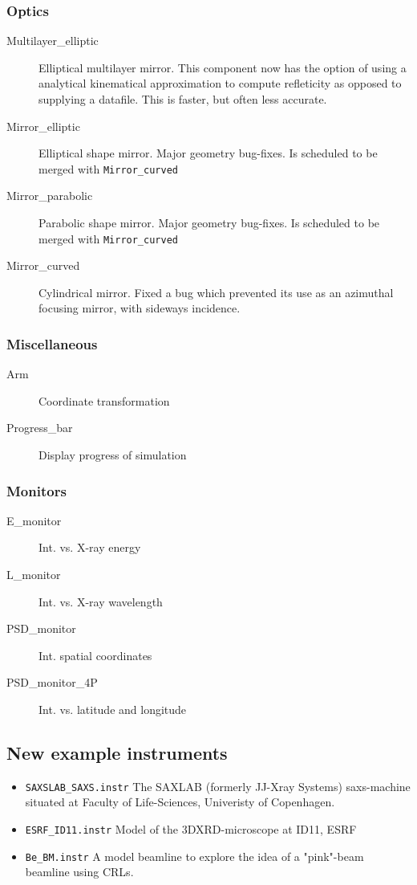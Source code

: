 \subsubsection*{Optics}
\begin{description}
\item[Multilayer\_elliptic] Elliptical multilayer mirror. This component now has the option of using a analytical kinematical approximation to compute refleticity as opposed to supplying a datafile. This is faster, but often less accurate.
\item[Mirror\_elliptic] Elliptical shape mirror. Major geometry bug-fixes. Is scheduled to be merged with \texttt{Mirror\_curved}
\item[Mirror\_parabolic] Parabolic shape mirror. Major geometry bug-fixes. Is scheduled to be merged with \texttt{Mirror\_curved}
\item[Mirror\_curved] Cylindrical mirror. Fixed a bug which prevented its use as an azimuthal focusing mirror, with sideways incidence. 


\end{description}
\subsubsection*{Miscellaneous}
\begin{description}
\item[Arm] Coordinate transformation
\item[Progress\_bar] Display progress of simulation
\end{description}
\subsubsection*{Monitors}
\begin{description}
\item[E\_monitor] Int. vs. X-ray energy
\item[L\_monitor] Int. vs. X-ray wavelength
\item[PSD\_monitor] Int. spatial coordinates
\item[PSD\_monitor\_4P] Int. vs. latitude and longitude
\end{description}


\subsection{New example instruments}


\begin{itemize}
\item \verb+SAXSLAB_SAXS.instr+ The SAXLAB (formerly JJ-Xray Systems) saxs-machine situated at Faculty of Life-Sciences, Univeristy of Copenhagen. 
\item \verb+ESRF_ID11.instr+ Model of the 3DXRD-microscope at ID11, ESRF
\item \verb+Be_BM.instr+ A model beamline to explore the idea of a "pink"-beam beamline using CRLs\cite{vaughan2011x}.
\end{itemize}

